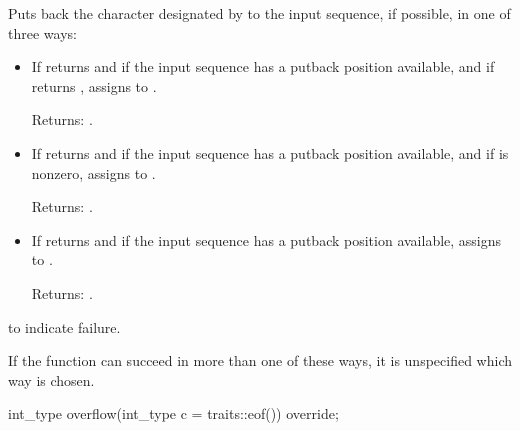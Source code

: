 \begin{itemdescr}
\pnum
\effects
Puts back the character designated by  to the input
sequence, if possible, in one of three ways:
\begin{itemize}
\item
If
returns
and
if the input sequence has a putback position available, and
if
returns
,
assigns
to
.

Returns:
.
\item
If
returns
and if the input sequence
has a putback position available, and
if 
\tcode{\&}
 is
nonzero,
assigns  to
.

Returns:
.
\item
If
returns
and if the input sequence has a putback position available,
assigns
to
.

Returns:
.
\end{itemize}

\pnum
\returns
{}
to indicate failure.

\pnum
\remarks
If the function can succeed in more than one of these ways, it is
unspecified which way is chosen.
%
\end{itemdescr}

%
\begin{itemdecl}
int_type overflow(int_type c = traits::eof()) override;
\end{itemdecl}

